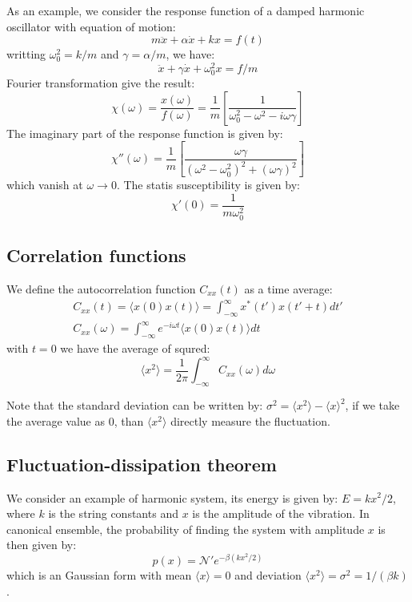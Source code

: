 \documentclass{article}
\begin{document}
As an example, we consider the response function of a damped harmonic oscillator 
with equation of motion:
\begin{equation}
    m \ddot{x} + \alpha \dot{x} + kx = f(t)
\end{equation}
writting $\omega_0^2 = k/m$ and $\gamma = \alpha/m$, we have:
\begin{equation}
    \ddot{x} + \gamma \dot{x} + \omega_0^2x = f/m
\end{equation}
Fourier transformation give the result:
\begin{equation}
    \chi(\omega) = \frac{x(\omega)}{f(\omega)} 
    = \frac{1}{m} \left[ \frac{1}{\omega_0^2 - \omega^2 - i\omega \gamma} \right]
\end{equation}
The imaginary part of the response function is given by:
\begin{equation}
    \chi''(\omega)  
    = \frac{1}{m} \left[ \frac{\omega \gamma}{(\omega^2 - \omega_0^2)^2 + (\omega \gamma)^2} \right]
\end{equation}
which vanish at $\omega \to 0$. The statis susceptibility is given by:
\begin{equation}
    \chi'(0) = \frac{1}{m\omega_0^2}
\end{equation}


\subsection{Correlation functions}
We define the autocorrelation function $C_{xx}(t)$ as a time average:
\begin{gather}
    C_{xx}(t) = \langle x(0)x(t) \rangle = \int_{-\infty}^{\infty} x^*(t')x(t'+t) dt' \\
    C_{xx}(\omega) = \int_{-\infty}^{\infty} e^{-i\omega t}\langle x(0)x(t) \rangle dt
\end{gather}
with $t=0$ we have the average of squred:
\begin{equation}
    \langle x^2 \rangle = 
    \frac{1}{2\pi} \int_{-\infty}^{\infty} C_{xx}(\omega) d\omega
\end{equation}

Note that the standard deviation can be written by: 
$\sigma^2 = \langle x^2 \rangle - \langle x \rangle ^2 $, if we take the average value
as $0$, than $\langle x^2 \rangle$ directly measure the fluctuation.

\subsection{Fluctuation-dissipation theorem}
We consider an example of harmonic system, its energy is given by: $E = kx^2 /2 $, where
$k$ is the string constants and $x$ is the amplitude of the vibration. In canonical 
ensemble, the probability of finding the system with amplitude $x$ is then given by:
\begin{equation}
    p(x) = \mathcal{N}' e^{-\beta(kx^2/2)}
\end{equation}
which is an Gaussian form with mean $\langle x \rangle = 0$ and deviation
$\langle x^2 \rangle = \sigma^2 = 1/(\beta k)$. 
\end{document}
